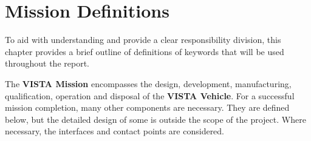 \chapter{Mission Definitions}
\label{chapter: misison definitions}

To aid with understanding and provide a clear responsibility division, this chapter provides a brief outline of definitions of keywords that will be used throughout the report.

The \textbf{VISTA Mission} encompasses the design, development, manufacturing, qualification, operation and disposal of the \textbf{VISTA Vehicle}. For a successful mission completion, many other components are necessary. They are defined below, but the detailed design of some is outside the scope of the project. Where necessary, the interfaces and contact points are considered.

